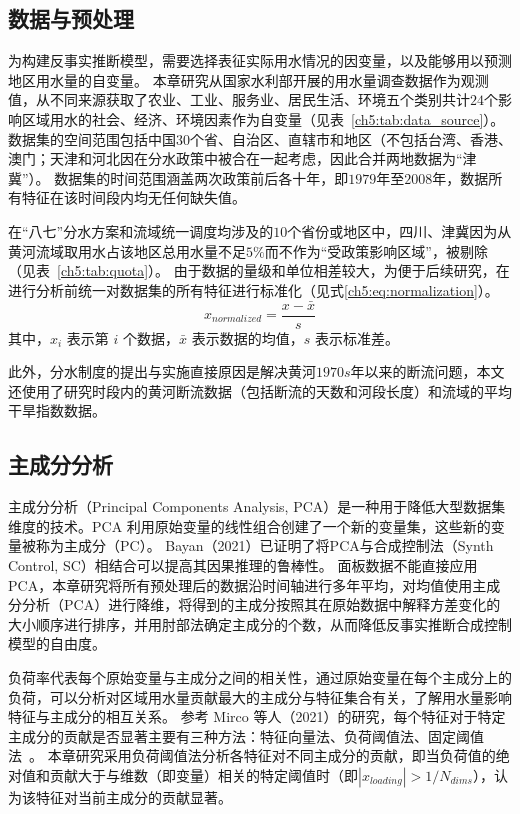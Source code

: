 \subsection{数据与预处理}\label{sec:dataset}

为构建反事实推断模型，需要选择表征实际用水情况的因变量，以及能够用以预测地区用水量的自变量。
本章研究从国家水利部开展的用水量调查数据作为观测值，从不同来源获取了农业、工业、服务业、居民生活、环境五个类别共计$24$个影响区域用水的社会、经济、环境因素作为自变量\cite{zhou2020}（见表~\ref{ch5:tab:data_source}）。
数据集的空间范围包括中国$30$个省、自治区、直辖市和地区（不包括台湾、香港、澳门；天津和河北因在分水政策中被合在一起考虑，因此合并两地数据为“津冀”）。
数据集的时间范围涵盖两次政策前后各十年，即$1979$年至$2008$年，数据所有特征在该时间段内均无任何缺失值。



在“八七”分水方案和流域统一调度均涉及的$10$个省份或地区中，四川、津冀因为从黄河流域取用水占该地区总用水量不足$5\%$而不作为“受政策影响区域”，被剔除（见表~\ref{ch5:tab:quota}）。
由于数据的量级和单位相差较大，为便于后续研究，在进行分析前统一对数据集的所有特征进行标准化（见式\ref{ch5:eq:normalization}）。
\begin{equation}
    x_{\textit{normalized}}=\frac{x-\bar{x}}{s}
    \label{ch5:eq:normalization}
\end{equation}
其中，$x_i$ 表示第 $i$ 个数据，$\bar{x}$ 表示数据的均值，$s$ 表示标准差。

此外，分水制度的提出与实施直接原因是解决黄河$1970s$年以来的断流问题\cite{wang2019b}，本文还使用了研究时段内的黄河断流数据（包括断流的天数和河段长度）和流域的平均干旱指数数据\cite{wang2022e}。

\subsection{主成分分析}

主成分分析（Principal Components Analysis, PCA）是一种用于降低大型数据集维度的技术。PCA 利用原始变量的线性组合创建了一个新的变量集，这些新的变量被称为主成分（PC）。
Bayan（2021）\cite{bayani2021}已证明了将PCA与合成控制法（Synth Control, SC）相结合可以提高其因果推理的鲁棒性。
面板数据不能直接应用 PCA，本章研究将所有预处理后的数据沿时间轴进行多年平均，对均值使用主成分分析（PCA）进行降维，将得到的主成分按照其在原始数据中解释方差变化的大小顺序进行排序，并用肘部法确定主成分的个数，从而降低反事实推断合成控制模型的自由度。

负荷率代表每个原始变量与主成分之间的相关性，通过原始变量在每个主成分上的负荷，可以分析对区域用水量贡献最大的主成分与特征集合有关，了解用水量影响特征与主成分的相互关系。
参考 Mirco 等人（2021）的研究，每个特征对于特定主成分的贡献是否显著主要有三种方法：特征向量法、负荷阈值法、固定阈值法~\cite{migliavacca2021}。
本章研究采用负荷阈值法分析各特征对不同主成分的贡献，即当负荷值的绝对值和贡献大于与维数（即变量）相关的特定阈值时（即$|{x_{loading}}| > 1/N_{dims}$），认为该特征对当前主成分的贡献显著。



